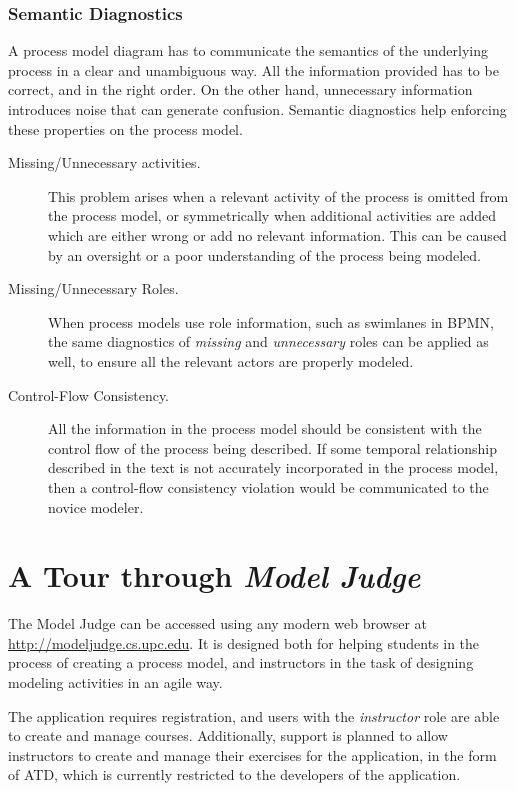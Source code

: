 \subsubsection{Semantic Diagnostics}

A process model diagram has to communicate the semantics of the underlying
process in a clear and unambiguous way. All the information provided has to be
correct, and in the right order. On the other hand, unnecessary information
introduces noise that can generate confusion. Semantic diagnostics help
enforcing these properties on the process model.

\begin{description}
\item[Missing/Unnecessary activities.]{This problem arises when a relevant
    activity of the process is omitted from the process model, or symmetrically
    when additional activities are added which are either wrong or add no
    relevant information. This can be caused by an oversight or a poor
    understanding of the process being modeled.}

\item[Missing/Unnecessary Roles.]{When process models use role information,
    such as swimlanes in BPMN, the same diagnostics of \emph{missing} 
    and \emph{unnecessary} roles can be applied as well, to ensure
    all the relevant actors are properly modeled.}

\item[Control-Flow Consistency.]{All the information in the process model should
    be consistent with the control flow of the process being described. If some
    temporal relationship described in the text is not accurately incorporated
    in the process model, then a control-flow consistency violation would be
    communicated to the novice modeler.}
\end{description}

\section{A Tour through \emph{Model Judge}}
\label{sec:modeljudge_tour}

The Model Judge can be accessed using any modern web browser at
\url{http://modeljudge.cs.upc.edu}. It is designed both for helping students in
the process of creating a process model, and instructors in the task of
designing modeling activities in an agile way. 

The application requires registration, and users with the \emph{instructor} role
are able to create and manage courses. Additionally, support is planned to allow
instructors to create and manage their exercises for the application, in the
form of ATD, which is currently restricted to the developers of the application.


